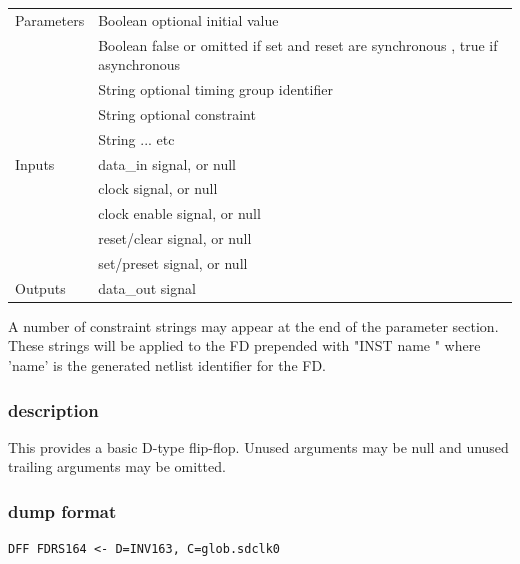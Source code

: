 \documentclass[10pt,a4paper,twoside,fleqn]{book}
\begin{document}
                    \begin{tabular}{| l | l |}
                    \hline
                    Parameters  & Boolean optional initial value \\
                                & Boolean false or omitted if set and reset are synchronous
                                  , true if asynchronous \\
                                & String  optional timing group identifier \\
                                & String  optional constraint \\
                                & String  ... etc \\
                    \hline
                    Inputs      & data\_in signal, or null \\
                                & clock signal, or null \\
                                & clock enable signal, or null \\
                                & reset/clear signal, or null \\
                                & set/preset signal, or null \\
                    \hline
                    Outputs     & data\_out signal \\
                    \hline
                    \end{tabular}

                    A number of constraint strings may appear at the end of the
                    parameter section. These strings will be applied to the FD
                    prepended with "INST name " where 'name' is the generated
                    netlist identifier for the FD.
                    

                \subsubsection{description}

                    This provides a basic D-type flip-flop. Unused arguments may be
                    null and unused trailing arguments may be omitted.

                \subsubsection{dump format}

                    \begin{lstlisting}[gobble=20, language=tde]
                        DFF FDRS164 <- D=INV163, C=glob.sdclk0
                    \end{lstlisting}
\end{document}
